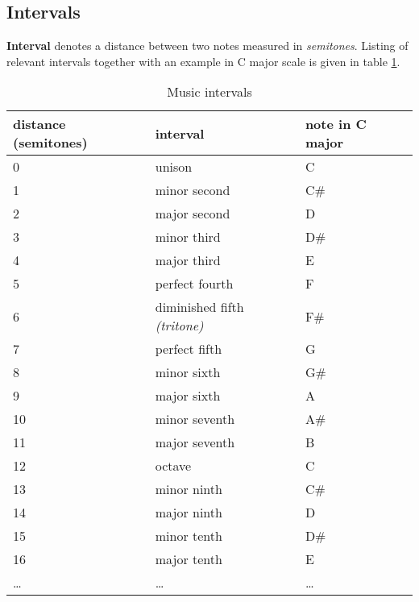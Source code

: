 \documentclass[11pt]{article} %
\begin{document}
\subsection{Intervals}
\textbf{Interval} denotes a distance between two notes measured in \emph{semitones}. Listing of relevant intervals together with an example in C major scale is given in table \ref{int}.
\begin{table}[]
\centering
\caption{Music intervals}
\label{int}
\begin{tabular}{|l|l|l|}
\hline
distance (semitones) & interval                           & note in C major \\ \hline
0                    & unison                             & C               \\ \hline
1                    & minor second                       & C\#             \\ \hline
2                    & major second                       & D               \\ \hline
3                    & minor third                        & D\#             \\ \hline
4                    & major third                        & E               \\ \hline
5                    & perfect fourth                     & F               \\ \hline
6                    & diminished fifth \emph{(tritone)} & F\#             \\ \hline
7                    & perfect fifth                      & G               \\ \hline
8                    & minor sixth                        & G\#             \\ \hline
9                    & major sixth                        & A               \\ \hline
10                   & minor seventh                      & A\#             \\ \hline
11                   & major seventh                      & B               \\ \hline
12                   & octave & C               \\ \hline
13                   & minor ninth & C\#               \\ \hline
14                   & major ninth & D               \\ \hline
15                   & minor tenth& D\#               \\ \hline
16                   & major tenth& E               \\ \hline
\dots                   & \dots 			& \dots               \\ \hline
\end{tabular}
\end{table}
\end{document}
